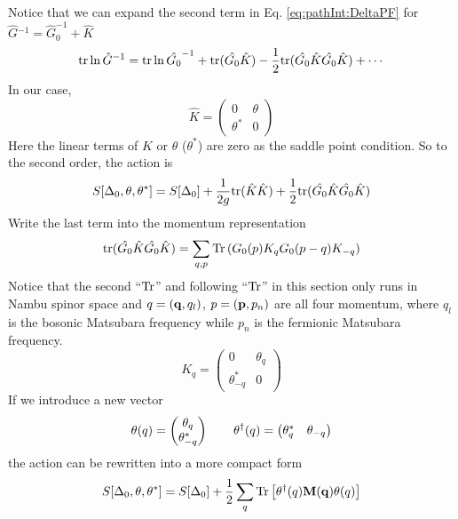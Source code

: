 Notice that we can expand the second term in Eq. \ref{eq:pathInt:DeltaPF} for $\hat{G}{}^{-1}=\hat{G}_{0}^{-1}+\hat{K}$
\begin{equation}\label{eq:pathInt:expand}
\text{tr}\ln \hat{G}^{-1}=\text{tr}\ln\hat{G_{0}}^{-1}+\text{tr}(\hat{G_{0}}\hat{K})-\frac{1}{2}\text{tr}(\hat{G_{0}}\hat{K}\hat{G_{0}}\hat{K})+\cdots
\end{equation}
In our case,
\begin{equation}
\hat{K}=\begin{pmatrix}
0&\theta\\
\theta^{*}&0
\end{pmatrix}
\end{equation}
Here the linear terms of $\hat{K}$ or $\theta$ ($\theta^{*}$) are zero as the saddle point condition.  So to the second order, the action is 
\begin{equation}\label{eq:pathInt:DeltaActionGaussian}
S[\Delta_{0},\theta,\theta^{*}]=S[\Delta_{0}]+
	\frac{1}{2g}\text{tr}(\hat{K}\hat{K})+\frac{1}{2}\text{tr}(\hat{G_{0}}\hat{K}\hat{G_{0}}\hat{K})
\end{equation}
Write the last term into the momentum representation
\begin{equation}
\text{tr}(\hat{G_{0}}\hat{K}\hat{G_{0}}\hat{K})=\sum_{q,p}\text{Tr}\left(G_{0}({p})K_{q}G_{0}{}({p-q})K_{-q}\right)
\end{equation}
Notice that the second ``$\text{Tr}$'' and following ``$\text{Tr}$'' in this section only runs in Nambu spinor space and $q={(\mathbf{q},q_{l})}$, $p=(\mathbf{p},p_{n})$ are all four momentum, where $q_{l}$ is the bosonic Matsubara frequency while $p_{n}$ is the fermionic Matsubara frequency.
\begin{equation}
K_{q}=\begin{pmatrix}
0&\theta_{q}\\
\theta^{*}_{-q}&0
\end{pmatrix}
\end{equation}
If we introduce  a new vector 
\begin{equation}
\theta{(q)}=\begin{pmatrix}\theta_{q}\\\theta^{*}_{-q}\end{pmatrix}\qquad
\theta^{\dagger}{(q)}=\begin{pmatrix}\theta^{*}_{q}&\theta_{-q}\end{pmatrix}
\end{equation}
the action can be rewritten into a more compact form
\begin{equation}
S[\Delta_{0},\theta,\theta^{*}]=S[\Delta_{0}]+\frac{1}{2}\sum_{q}\text{Tr}\left[\theta^{\dagger}(q)\mathbf{M(q)}\theta(q)\right]
\end{equation}
